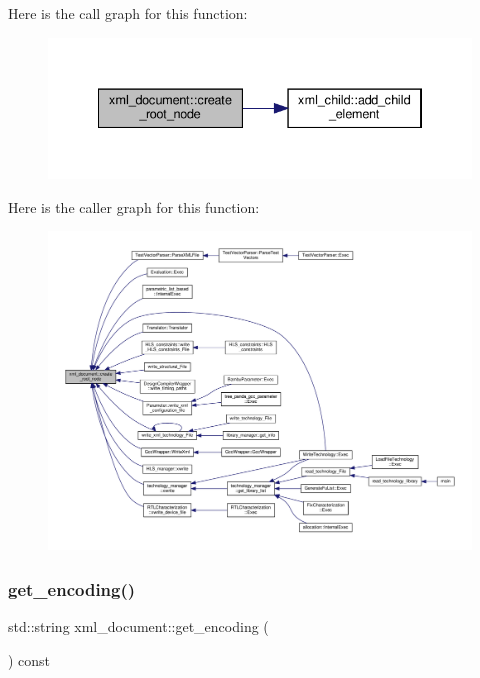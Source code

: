 Here is the call graph for this function\+:
\nopagebreak
\begin{figure}[H]
\begin{center}
\leavevmode
\includegraphics[width=334pt]{d8/dee/classxml__document_affb3c5eca511533f87419fdcd4539cc7_cgraph}
\end{center}
\end{figure}
Here is the caller graph for this function\+:
\nopagebreak
\begin{figure}[H]
\begin{center}
\leavevmode
\includegraphics[width=350pt]{d8/dee/classxml__document_affb3c5eca511533f87419fdcd4539cc7_icgraph}
\end{center}
\end{figure}
\mbox{\label{classxml__document_add2110c6e02cc44713278c07811cb07d}} 
\subsubsection{\texorpdfstring{get\+\_\+encoding()}{get\_encoding()}}
{\footnotesize\ttfamily std\+::string xml\+\_\+document\+::get\+\_\+encoding (\begin{DoxyParamCaption}{ }\end{DoxyParamCaption}) const\hspace{0.3cm}{\ttfamily [inline]}}

